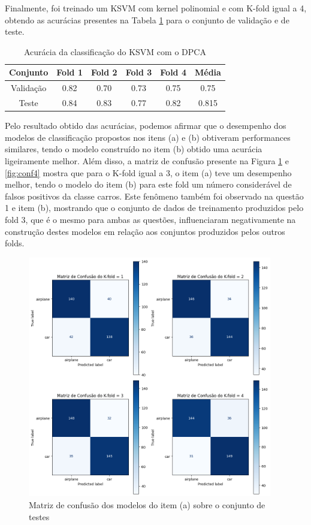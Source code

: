 \documentclass[]{abntex2}
\begin{document}
Finalmente, foi treinado um KSVM com kernel polinomial e com K-fold igual a 4, obtendo as acurácias presentes na Tabela \ref{tab:dpca_ksvm} para o conjunto de validação e de teste.

\begin{table}[H]
    \centering
    \begin{tabular}{|c|c|c|c|c|c|}
    \hline
    \rowcolor[HTML]{C0C0C0} 
    Conjunto                          & Fold 1 & Fold 2 & Fold 3 & Fold 4 & Média  \\ \hline
    \cellcolor[HTML]{C0C0C0}Validação & 0.82   & 0.70  & 0.73   & 0.75   & 0.75  \\ \hline
    \cellcolor[HTML]{C0C0C0}Teste     & 0.84   & 0.83   & 0.77   & 0.82   & 0.815 \\ \hline
    \end{tabular}
    \caption{Acurácia da classificação do KSVM com o DPCA}
    \label{tab:dpca_ksvm}
\end{table}

Pelo resultado obtido das acurácias, podemos afirmar que o desempenho dos modelos de classificação propostos nos itens (a) e (b) obtiveram performances similares, tendo o modelo construído no item (b) obtido uma acurácia ligeiramente melhor. Além disso, a matriz de confusão presente na Figura \ref{fig:conf3} e \ref{fig:conf4} mostra que para o K-fold igual a 3, o item (a) teve um desempenho melhor, tendo o modelo do item (b) para este fold um número considerável de falsos positivos da classe carros. Este fenômeno também foi observado na questão 1 e item (b), mostrando que o conjunto de dados de treinamento produzidos pelo fold 3, que é o mesmo para ambas as questões, influenciaram negativamente na construção destes modelos em relação aos conjuntos produzidos pelos outros folds.

\begin{figure}[H]
    \centering 
    \includegraphics[width=0.95\textwidth]{imgs/ex3/conf3.png}
    \caption{Matriz de confusão dos modelos do item (a) sobre o conjunto de testes}
    \label{fig:conf3} %
\end{figure}
\end{document}
